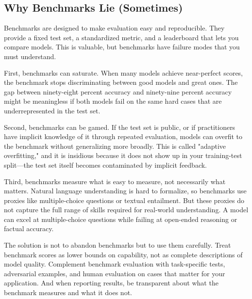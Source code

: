\subsection{Why Benchmarks Lie (Sometimes)}

Benchmarks are designed to make evaluation easy and reproducible. They provide a fixed test set, a standardized metric, and a leaderboard that lets you compare models. This is valuable, but benchmarks have failure modes that you must understand.

\vspace{0.3cm}

First, benchmarks can saturate. When many models achieve near-perfect scores, the benchmark stops discriminating between good models and great ones. The gap between ninety-eight percent accuracy and ninety-nine percent accuracy might be meaningless if both models fail on the same hard cases that are underrepresented in the test set.

\vspace{0.3cm}

Second, benchmarks can be gamed. If the test set is public, or if practitioners have implicit knowledge of it through repeated evaluation, models can overfit to the benchmark without generalizing more broadly. This is called "adaptive overfitting," and it is insidious because it does not show up in your training-test split---the test set itself becomes contaminated by implicit feedback.

\vspace{0.3cm}

Third, benchmarks measure what is easy to measure, not necessarily what matters. Natural language understanding is hard to formalize, so benchmarks use proxies like multiple-choice questions or textual entailment. But these proxies do not capture the full range of skills required for real-world understanding. A model can excel at multiple-choice questions while failing at open-ended reasoning or factual accuracy.

\vspace{0.3cm}

The solution is not to abandon benchmarks but to use them carefully. Treat benchmark scores as lower bounds on capability, not as complete descriptions of model quality. Complement benchmark evaluation with task-specific tests, adversarial examples, and human evaluation on cases that matter for your application. And when reporting results, be transparent about what the benchmark measures and what it does not.

